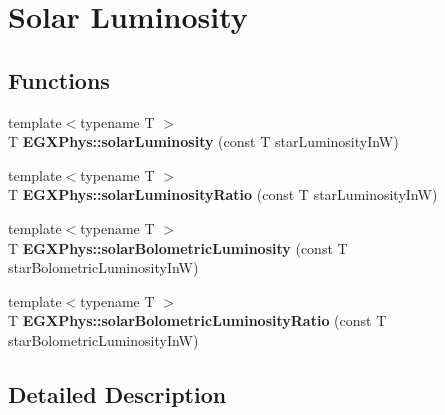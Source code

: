 \hypertarget{group___e_g_x_phys-_astrophysics-_solar_luminosity}{}\section{Solar Luminosity}
\label{group___e_g_x_phys-_astrophysics-_solar_luminosity}
\subsection*{Functions}
\begin{DoxyCompactItemize}
\item 
\mbox{\label{group___e_g_x_phys-_astrophysics-_solar_luminosity_ga91ffd6af02a4cd165e56b3891bafbece}} 
{\footnotesize template$<$typename T $>$ }\\T {\bfseries E\+G\+X\+Phys\+::solar\+Luminosity} (const T star\+Luminosity\+InW)
\item 
\mbox{\label{group___e_g_x_phys-_astrophysics-_solar_luminosity_gad9e8790d480f4ac8fcf37d2180fec626}} 
{\footnotesize template$<$typename T $>$ }\\T {\bfseries E\+G\+X\+Phys\+::solar\+Luminosity\+Ratio} (const T star\+Luminosity\+InW)
\item 
\mbox{\label{group___e_g_x_phys-_astrophysics-_solar_luminosity_ga5829dd9d9bb423b36c25d697335cedb3}} 
{\footnotesize template$<$typename T $>$ }\\T {\bfseries E\+G\+X\+Phys\+::solar\+Bolometric\+Luminosity} (const T star\+Bolometric\+Luminosity\+InW)
\item 
\mbox{\label{group___e_g_x_phys-_astrophysics-_solar_luminosity_ga776982acc6d10dd23f5eddf0481ef341}} 
{\footnotesize template$<$typename T $>$ }\\T {\bfseries E\+G\+X\+Phys\+::solar\+Bolometric\+Luminosity\+Ratio} (const T star\+Bolometric\+Luminosity\+InW)
\end{DoxyCompactItemize}


\subsection{Detailed Description}
